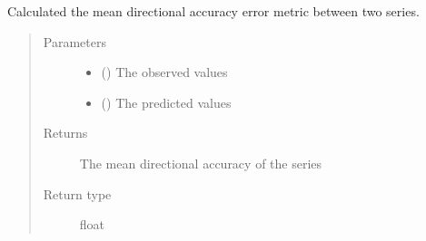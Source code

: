 \documentclass[letterpaper,10pt,english]{sphinxmanual}
\begin{document}
\begin{fulllineitems}
\label{\detokenize{index:Forecaster.eval_inspect.mean_directional_accuracy}}
Calculated the mean directional accuracy error metric
between two series.
\begin{quote}\begin{description}
\item[{Parameters}] \leavevmode\begin{itemize}
\item {} 
 () \textendash{} The observed values

\item {} 
 () \textendash{} The predicted values

\end{itemize}

\item[{Returns}] \leavevmode
The mean directional accuracy of the series

\item[{Return type}] \leavevmode
float

\end{description}\end{quote}

\end{fulllineitems}

\end{document}
